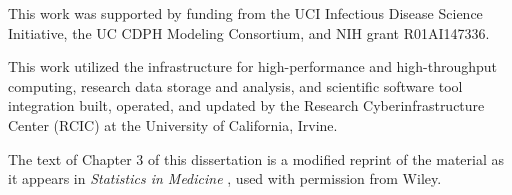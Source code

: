 {This work was supported by funding from the UCI Infectious Disease Science Initiative, the UC CDPH Modeling Consortium, and NIH grant R01AI147336.

This work utilized the infrastructure for high-performance and high-throughput computing, research data storage and analysis, and scientific software tool integration built, operated, and updated by the Research Cyberinfrastructure Center (RCIC) at the University of California, Irvine.

The text of Chapter 3 of this dissertation is a modified reprint of the material as it appears in \textit{Statistics in Medicine} \citep{Bayer2023Confidence}, used with permission from Wiley.
}


\newcommand{\mypubentry}[3]{
  \begin{tabular*}{1\textwidth}{@{\extracolsep{\fill}}p{4.5in}r}
    \textbf{#1} & \textbf{#2} \\
    \multicolumn{2}{@{\extracolsep{\fill}}p{.95\textwidth}}{#3}\vspace{6pt} \\
  \end{tabular*}
}
\newcommand{\mysoftentry}[3]{
  \begin{tabular*}{1\textwidth}{@{\extracolsep{\fill}}lr}
    \textbf{#1} & \url{#2} \\
    \multicolumn{2}{@{\extracolsep{\fill}}p{.95\textwidth}}
    {\emph{#3}}\vspace{-6pt} \\
  \end{tabular*}
}

